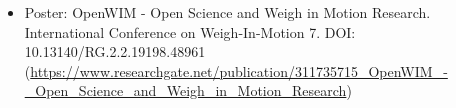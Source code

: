 \documentclass[10pt,a4paper,sans]{moderncv}        %
\begin{document}

\nocite{*}


\begin{itemize}
\item  Poster: OpenWIM - Open Science and Weigh in Motion Research. International Conference on Weigh-In-Motion 7. DOI: 10.13140/RG.2.2.19198.48961 (\url{https://www.researchgate.net/publication/311735715_OpenWIM_-_Open_Science_and_Weigh_in_Motion_Research})
\end{itemize}


\end{document}
